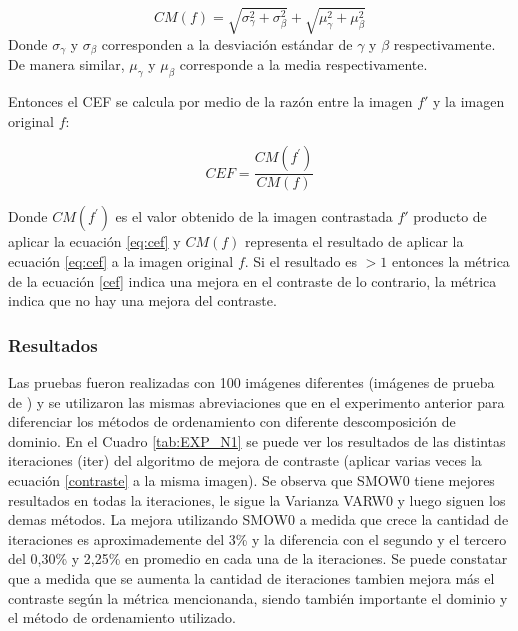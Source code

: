 \begin{equation}
CM(f)=\sqrt{\sigma_{\gamma}^{2} + \sigma_{\beta}^{2}} + \sqrt{\mu_{\gamma}^{2} + \mu_{\beta}^{2}}
\label{eq:cef}
\end{equation} Donde $\sigma_{\gamma}$ y $\sigma_{\beta}$ corresponden a la desviación estándar  de $\gamma$ y $\beta$ respectivamente. De manera similar, $\mu_{\gamma}$ y $\mu_{\beta}$ corresponde a la media respectivamente.

Entonces el CEF se calcula por medio de la razón entre la imagen $f'$ y la imagen original $f$:

\begin{equation}
CEF = \frac{CM(f^{'})}{CM(f)}
\label{cef}
\end{equation}

Donde $CM(f^{'})$ es el valor obtenido de la imagen contrastada $f'$ producto de aplicar la ecuación \ref{eq:cef} y $CM(f)$ representa el resultado de aplicar la ecuación \ref{eq:cef} a la imagen original $f$. Si el resultado es $> 1$  entonces la métrica de la ecuación \ref{cef} indica una mejora en el contraste de lo contrario, la métrica indica que no hay una mejora del contraste.



\subsubsection{Resultados}
 Las pruebas fueron realizadas con 100 im\'agenes diferentes (im\'agenes de prueba de \cite{arbelaez2007berkeley}) y se utilizaron las mismas abreviaciones que en el experimento anterior para diferenciar los métodos de ordenamiento con diferente descomposición de dominio. 
En el Cuadro \ref{tab:EXP_N1} se puede ver los resultados de las distintas iteraciones (iter) del algoritmo de mejora de contraste (aplicar varias veces la ecuación \ref{contraste} a la misma imagen).  
Se observa que SMOW0 tiene mejores resultados en todas la iteraciones, le sigue la Varianza VARW0 y luego siguen los demas métodos. La mejora utilizando SMOW0 a medida que crece la cantidad de iteraciones es aproximademente del 3\% y la diferencia con el segundo y el tercero del 0,30\% y 2,25\% en promedio en cada una de la iteraciones.
Se puede constatar que a medida que se aumenta la cantidad de iteraciones  tambien mejora más el contraste según la métrica mencionanda, siendo también importante el dominio y el método de ordenamiento utilizado.

